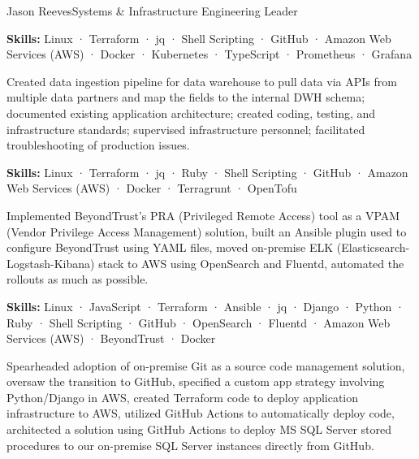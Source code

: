 \documentclass{article}
\begin{document}
\begin{cv}{Jason Reeves}{Systems \& Infrastructure Engineering Leader}
\begin{cvevent}[June 2024][December 2025]
\textbf{Skills:}  Linux · Terraform · jq · Shell Scripting · GitHub · Amazon Web Services (AWS) · Docker · Kubernetes · TypeScript · Prometheus · Grafana
    
    \vspace*{5mm}
\end{cvevent}

\begin{cvevent}[December 2023][June 2024]
    Created data ingestion pipeline for data warehouse to pull data via APIs from multiple data partners and map the fields to the internal DWH schema; documented existing application architecture; created coding, testing, and infrastructure standards; supervised infrastructure personnel; facilitated troubleshooting of production issues.

    \vspace*{3mm}
    \textbf{Skills:}  Linux · Terraform · jq · Ruby · Shell Scripting · GitHub · Amazon Web Services (AWS) · Docker · Terragrunt · OpenTofu
    
    \vspace*{5mm}
\end{cvevent}

\begin{cvevent}[August 2021][December 2023]
    Implemented BeyondTrust's PRA (Privileged Remote Access) tool as a VPAM (Vendor Privilege Access Management) solution, built an Ansible plugin used to configure BeyondTrust using YAML files, moved on-premise ELK (Elasticsearch-Logstash-Kibana) stack to AWS using OpenSearch and Fluentd, automated the rollouts as much as possible.

    \vspace*{3mm}
    \textbf{Skills:}  Linux · JavaScript · Terraform · Ansible · jq · Django · Python · Ruby · Shell Scripting · GitHub · OpenSearch · Fluentd · Amazon Web Services (AWS) · BeyondTrust · Docker

    \vspace*{5mm}
\end{cvevent}

\begin{cvevent}[Mar 2018][Aug 2021]
  Spearheaded adoption of on-premise Git as a source code management solution, oversaw the transition to GitHub, specified a custom app strategy involving Python/Django in AWS, created Terraform code to deploy application infrastructure to AWS, utilized GitHub Actions to automatically deploy code, architected a solution using GitHub Actions to deploy MS SQL Server stored procedures to our on-premise SQL Server instances directly from GitHub.
  

\end{cvevent}
\end{cv}
\end{document}
